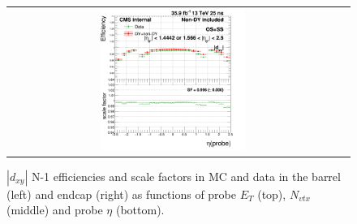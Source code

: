 \begin{figure}[bh]
\begin{center}
\begin{tabular}{cc}
      \includegraphics[width=0.45\textwidth]{figures/Zprime/2016/ScaleFactor/SameSign/N_1_eff/g_compare_cut_eta_Barrel+Endcap_ea_ta_inc_AS_N_1_Dxy_PUW.png}
    \end{tabular}
    \caption{$|d_{xy}|$ N-1 efficiencies and scale factors in MC and data in the barrel (left) and endcap (right) as functions of probe $E_T$ (top), $N_{vtx}$ (middle) and probe $\eta$ (bottom).}
    \label{fig:Dxy_2016}
  \end{center}
\end{figure}

